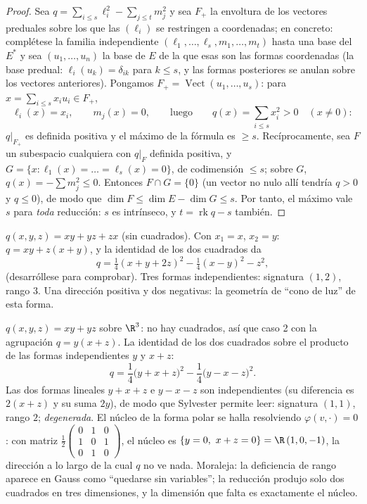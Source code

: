 \begin{proof}
Sea $q = \sum_{i \leq s}\ell_i^2 - \sum_{j\leq t} m_j^2$ y sea $F_+$
la envoltura de los vectores preduales sobre los que las
$(\ell_i)$ se restringen a coordenadas; en concreto: complétese la
familia independiente $(\ell_1, \dots, \ell_s, m_1, \dots, m_t)$
hasta una base del  $E^*$ y sea $(u_1, \dots, u_n)$ la base de
$E$ de la que esas son las formas coordenadas (la base predual:
$\ell_i(u_k) = \delta_{ik}$ para $k \leq s$, y las formas
posteriores se anulan sobre los vectores anteriores). Pongamos $F_+
= \operatorname{Vect}(u_1, \dots, u_s)$: para $x = \sum_{i\leq
s}x_iu_i \in F_+$,
\[
\ell_i(x) = x_i,
\qquad m_j(x) = 0,
\qquad\text{luego}\qquad
q(x) = \sum_{i\leq s}x_i^2 > 0 \quad (x \neq 0) :
\]
$q|_{F_+}$ es definida positiva y el máximo de la fórmula es $\geq
s$. Recíprocamente, sea $F$ un subespacio cualquiera con $q|_F$
definida positiva, y $G = \{x : \ell_1(x) = \dots = \ell_s(x) =
0\}$, de codimensión $\leq s$; sobre $G$, $q(x) = -\sum m_j^2 \leq
0$. Entonces $F \cap G = \{0\}$ (un vector no nulo allí tendría $q >
0$ y $q \leq 0$), de modo que $\dim F \leq \dim E - \dim G \leq s$.
Por tanto, el máximo vale $s$ para \emph{toda} reducción: $s$ es
intrínseco, y $t = \operatorname{rk} q - s$ también.
\end{proof}

\begin{example}\label{ex:b2:quadratic:gaussexample}
$q(x, y, z) = xy + yz + zx$ (sin cuadrados). Con $x_1 = x$, $x_2 =
y$: $q = xy + z(x + y)$, y la identidad de los dos cuadrados da
\[
q = \tfrac14(x + y + 2z)^2 - \tfrac14(x - y)^2 - z^2 ,
\]
(desarróllese para comprobar). Tres formas independientes:
signatura $(1, 2)$, rango $3$. Una dirección positiva y dos
negativas: la geometría de ``cono de luz'' de esta forma.
\end{example}

\begin{example}\label{ex:b2:quadratic:degenerate}
$q(x, y, z) = xy + yz$ sobre $\R^3$: no hay cuadrados, así que caso
2 con la agrupación $q = y(x + z)$. La identidad de los dos
cuadrados sobre el producto de las formas independientes $y$ y $x +
z$:
\[
q = \frac14\bigl(y + x + z\bigr)^2 -
\frac14\bigl(y - x - z\bigr)^2 .
\]
Las dos formas lineales $y + x + z$ e $y - x - z$ son independientes
(su diferencia es $2(x+z)$ y su suma $2y$), de modo que Sylvester
permite leer: signatura $(1, 1)$, rango $2$; \emph{degenerada}. El
núcleo de la forma polar se halla resolviendo $\varphi(v, \cdot) =
0$: con matriz $\frac12\begin{pmatrix} 0&1&0\\ 1&0&1\\
0&1&0\end{pmatrix}$, el núcleo es $\{y = 0,\ x + z = 0\} = \R\,(1,
0, -1)$, la dirección a lo largo de la cual $q$ no ve nada.
Moraleja: la deficiencia de rango aparece en Gauss como ``quedarse
sin variables''; la reducción produjo solo dos cuadrados en tres
dimensiones, y la dimensión que falta es exactamente el núcleo.
\end{example}

